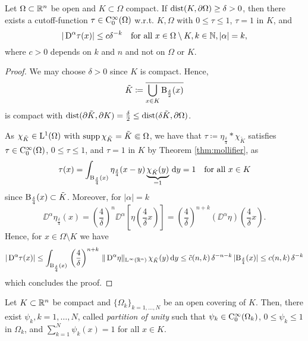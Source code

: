 \begin{lem}
  \label{lem:cutoff}
  Let $\Omega \subset \mathbb{R}^n$ be open and $K \subset \Omega$ compact.
  If $\operatorname{dist}(K, \partial \Omega) \geq \delta > 0$, then there exists a cutoff\hyp{}function $\tau \in \mathrm{C}_0^\infty(\Omega)$ w.r.t. $K, \Omega$ with $0 \leq \tau \leq 1$, $\tau = 1$ in $K$, and 
  $$
|\,{\operatorname{D}}^\alpha \tau(x) | \leq c \delta^{-k} \quad\text{for all } x \in \Omega \setminus K, k \in \mathbb{N} , |\alpha| = k,
  $$ 
  where $c > 0$ depends on $k$ and $n$ and not on $\Omega$ or $K$.
\end{lem}

\begin{proof}
  We may choose $\delta > 0$ since $K$ is compact.
  Hence, 
  $$
  \tilde K \coloneqq \overline{\bigcup_{x \in K} \mathrm{B}_{\frac{\delta}{2}}(x)}
  $$
  is compact with $\operatorname{dist}(\partial \tilde K, \partial K) = \frac{\delta}{2} \leq \operatorname{dist}(\delta \tilde K, \partial \Omega)$.

  As $\chi_{\tilde K} \in \mathrm{L}^1(\Omega)$ with $\operatorname{supp} \chi_{\tilde K} = \tilde K \Subset \Omega$, we have that $\tau \coloneqq \eta_{\frac{\delta}{4}} \ast \chi_{\tilde K}$ satisfies $\tau \in \mathrm{C}_0^\infty(\Omega)$, $0 \leq \tau \leq 1$, and $\tau = 1$ in $K$ by Theorem \ref{thm:mollifier}, as
  $$
  \tau(x) 
  = \int_{\mathrm{B}_{\frac{\delta}{4}}(x)}\eta_{\frac{\delta}{4}}(x - y) \underbrace{\chi_{\tilde K}(y)}_{= 1} \, {\operatorname{d}\!{y}} 
  = 1 \quad\text{for all }x \in K
  $$
  since $\mathrm{B}_{\frac{\delta}{4}}(x) \subset \tilde K$.
  Moreover, for $|\alpha| = k$
  $$
  \DD^\alpha \eta_{\frac{\delta}{4}}(x) 
  = \left( \frac{4}{\delta}\right)^n \DD^\alpha \left[ \eta \left( \frac{4 }{\delta} x \right) \right] 
  =  \left( \frac{4}{\delta}\right)^{n+k} (\DD^\alpha \eta)\left( \frac{4}{\delta} x \right).
  $$
  Hence, for $x \in \Omega \setminus K$ we have 
  $$
    |\,{\operatorname{D}}^\alpha \tau (x) | 
    \leq \int_{\mathrm{B}_{\frac{\delta}{4}}(x)}\, \left(\frac{4}{\delta}\right)^{n + k}\, \|\,{\operatorname{D}}^\alpha \eta \|_{\mathrm{L}^\infty(\mathbb{R}^n)} \,\chi_{\tilde K}(y) \, {\operatorname{d}\!{y}}
    \leq \tilde c(n,k) \, \delta^{-n - k} \, |\mathrm{B}_{\frac{\delta}{4}}(x)| \leq c(n,k)\, \delta^{-k}
 $$
 which concludes the proof.
\end{proof}

\begin{lem}
  \label{lem:partitionOfUnity}
  Let $K \subset \mathbb{R}^n$ be compact and $\{\Omega_k\}_{k = 1,\dots,N}$ be an open covering of $K$.
  Then, there exist $\psi_k, k=1,\dots,N$, called \emph{partition of unity} such that $\psi_k \in \mathrm{C}_0^\infty(\Omega_k)$, $0 \leq \psi_k \leq 1$ in $\Omega_k$, and $\sum_{k = 1}^N \psi_k(x) = 1$ for all $x \in K$.
\end{lem}

